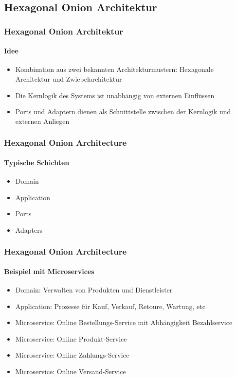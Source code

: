 \subsection{Hexagonal Onion Architektur}
\begin{frame}
  \frametitle{Hexagonal Onion Architektur}
  \framesubtitle{Idee}
  \begin{itemize}
    \item Kombination aus zwei bekannten Architekturmustern: Hexagonale Architektur und Zwiebelarchitektur
    \item Die Kernlogik des Systems ist unabhängig von externen Einflüssen 
    \item Ports und Adaptern dienen als Schnittstelle zwischen der Kernlogik und externen Anliegen
  \end{itemize}
\end{frame}

\begin{frame}
  \frametitle{Hexagonal Onion Architecture}
  \framesubtitle{Typische Schichten}
  \begin{itemize}
    \item Domain
    \item Application 
    \item Ports
    \item Adapters
  \end{itemize}
\end{frame}

\begin{frame}
  \frametitle{Hexagonal Onion Architecture}
  \framesubtitle{Beispiel mit Microservices}
  \begin{itemize}
    \item Domain: Verwalten von Produkten und Dienstleister
    \item Application: Prozesse für Kauf, Verkauf, Retoure, Wartung, etc 
    \item Microservice: Online Bestellungs-Service mit Abhängigkeit Bezahlservice
    \item Microservice: Online Produkt-Service
    \item Microservice: Online Zahlungs-Service
    \item Microservice: Online Versand-Service 
  \end{itemize}
\end{frame}